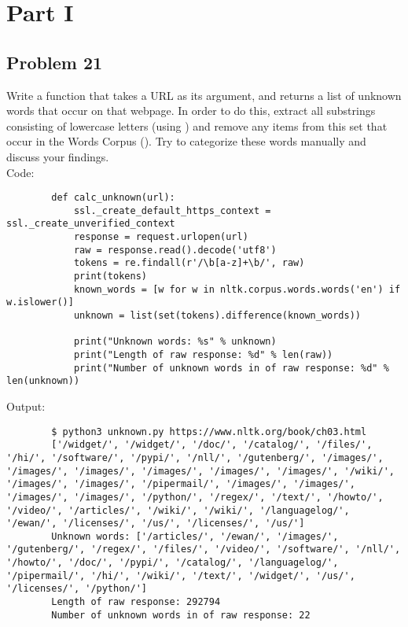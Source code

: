\documentclass[12pt]{article}
\begin{document}
	\section*{Part I}
		\subsection*{Problem 21}
		Write a function  that takes a URL as its argument, and returns a list of unknown words that occur on that webpage. In order to do this, extract all substrings consisting of lowercase letters (using ) and remove any items from this set that occur in the Words Corpus (). Try to categorize these words manually and discuss your findings.\\
		
		Code:
		\begin{lstlisting}
		def calc_unknown(url):
			ssl._create_default_https_context = ssl._create_unverified_context
			response = request.urlopen(url)
			raw = response.read().decode('utf8')
			tokens = re.findall(r'/\b[a-z]+\b/', raw)
			print(tokens)
			known_words = [w for w in nltk.corpus.words.words('en') if w.islower()]
			unknown = list(set(tokens).difference(known_words))
			
			print("Unknown words: %s" % unknown)
			print("Length of raw response: %d" % len(raw))
			print("Number of unknown words in of raw response: %d" % len(unknown))
		\end{lstlisting}
		
		Output:
		\begin{lstlisting}
		$ python3 unknown.py https://www.nltk.org/book/ch03.html
		['/widget/', '/widget/', '/doc/', '/catalog/', '/files/', '/hi/', '/software/', '/pypi/', '/nll/', '/gutenberg/', '/images/', '/images/', '/images/', '/images/', '/images/', '/images/', '/wiki/', '/images/', '/images/', '/pipermail/', '/images/', '/images/', '/images/', '/images/', '/python/', '/regex/', '/text/', '/howto/', '/video/', '/articles/', '/wiki/', '/wiki/', '/languagelog/', '/ewan/', '/licenses/', '/us/', '/licenses/', '/us/']
		Unknown words: ['/articles/', '/ewan/', '/images/', '/gutenberg/', '/regex/', '/files/', '/video/', '/software/', '/nll/', '/howto/', '/doc/', '/pypi/', '/catalog/', '/languagelog/', '/pipermail/', '/hi/', '/wiki/', '/text/', '/widget/', '/us/', '/licenses/', '/python/']
		Length of raw response: 292794
		Number of unknown words in of raw response: 22
		\end{lstlisting}
	
\end{document}
